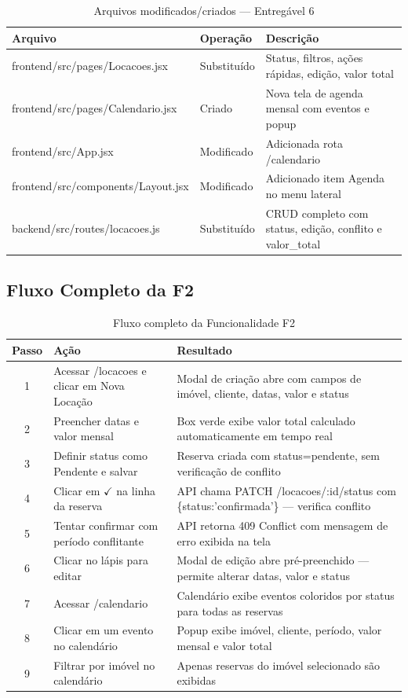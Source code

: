 \documentclass[12pt, a4paper]{article}
\newcommand{\thead}[1]{\cellcolor{tableheader}\color{white}\bfseries #1}
\newcommand{\talt}{\rowcolor{tablerowalt}}
\begin{document}
\begin{table}[H]
\centering
\begin{tabularx}{\textwidth}{|l|l|X|}
\hline
\thead{Arquivo} & \thead{Operação} & \thead{Descrição} \\
\hline
frontend/src/pages/Locacoes.jsx      & Substituído & Status, filtros, ações rápidas, edição, valor total \\
\talt frontend/src/pages/Calendario.jsx  & Criado      & Nova tela de agenda mensal com eventos e popup \\
frontend/src/App.jsx                 & Modificado  & Adicionada rota /calendario \\
\talt frontend/src/components/Layout.jsx & Modificado  & Adicionado item Agenda no menu lateral \\
backend/src/routes/locacoes.js       & Substituído & CRUD completo com status, edição, conflito e valor\_total \\
\hline
\end{tabularx}
\caption{Arquivos modificados/criados — Entregável 6}
\end{table}

\subsection{Fluxo Completo da F2}

\begin{table}[H]
\centering
\begin{tabularx}{\textwidth}{|c|l|X|}
\hline
\thead{Passo} & \thead{Ação} & \thead{Resultado} \\
\hline
1 & Acessar /locacoes e clicar em Nova Locação & Modal de criação abre com campos de imóvel, cliente, datas, valor e status \\
\talt 2 & Preencher datas e valor mensal & Box verde exibe valor total calculado automaticamente em tempo real \\
3 & Definir status como Pendente e salvar & Reserva criada com status=pendente, sem verificação de conflito \\
\talt 4 & Clicar em $\checkmark$ na linha da reserva & API chama PATCH /locacoes/:id/status com \{status:'confirmada'\} — verifica conflito \\
5 & Tentar confirmar com período conflitante & API retorna 409 Conflict com mensagem de erro exibida na tela \\
\talt 6 & Clicar no lápis para editar & Modal de edição abre pré-preenchido — permite alterar datas, valor e status \\
7 & Acessar /calendario & Calendário exibe eventos coloridos por status para todas as reservas \\
\talt 8 & Clicar em um evento no calendário & Popup exibe imóvel, cliente, período, valor mensal e valor total \\
9 & Filtrar por imóvel no calendário & Apenas reservas do imóvel selecionado são exibidas \\
\hline
\end{tabularx}
\caption{Fluxo completo da Funcionalidade F2}
\end{table}
\end{document}

